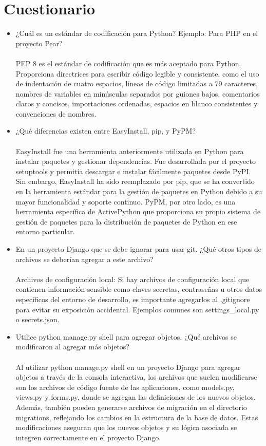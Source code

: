\documentclass{article}
\begin{document}
        \clearpage
 \section{Cuestionario}
	\begin{itemize}
		\item ¿Cuál es un estándar de codificación para Python? Ejemplo: Para PHP en el proyecto Pear? \\ \\
		PEP 8 es el estándar de codificación que es más aceptado para Python. Proporciona directrices para escribir código legible y consistente, como el uso de indentación de cuatro espacios, líneas de código limitadas a 79 caracteres, nombres de variables en minúsculas separados por guiones bajos, comentarios claros y concisos, importaciones ordenadas, espacios en blanco consistentes y convenciones de nombres.
		\item ¿Qué diferencias existen entre EasyInstall, pip, y PyPM? \\ \\
		EasyInstall fue una herramienta anteriormente utilizada en Python para instalar paquetes y gestionar dependencias. Fue desarrollada por el proyecto setuptools y permitía descargar e instalar fácilmente paquetes desde PyPI. Sin embargo, EasyInstall ha sido reemplazado por pip, que se ha convertido en la herramienta estándar para la gestión de paquetes en Python debido a su mayor funcionalidad y soporte continuo. PyPM, por otro lado, es una herramienta específica de ActivePython que proporciona su propio sistema de gestión de paquetes para la distribución de paquetes de Python en ese entorno particular.
		\item En un proyecto Django que se debe ignorar para usar git. ¿Qué otros tipos de archivos se deberían agregar a este archivo? \\ \\
		Archivos de configuración local: Si hay archivos de configuración local que contienen información sensible como claves secretas, contraseñas u otros datos específicos del entorno de desarrollo, es importante agregarlos al .gitignore para evitar su exposición accidental. Ejemplos comunes son settings\_local.py o secrets.json.
            \item Utilice python manage.py shell para agregar objetos. ¿Qué archivos se modificaron al agregar más objetos? \\ \\
            Al utilizar python manage.py shell en un proyecto Django para agregar objetos a través de la consola interactiva, los archivos que suelen modificarse son los archivos de código fuente de las aplicaciones, como models.py, views.py y forms.py, donde se agregan las definiciones de los nuevos objetos. Además, también pueden generarse archivos de migración en el directorio migrations, reflejando los cambios en la estructura de la base de datos. Estas modificaciones aseguran que los nuevos objetos y su lógica asociada se integren correctamente en el proyecto Django.

\end{itemize}
\end{document}
